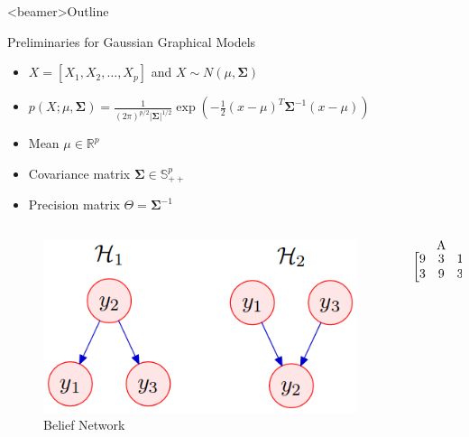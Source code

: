 \documentclass{beamer}
\begin{document}
\begin{frame}<beamer>{Outline}
\end{frame}

\begin{frame}{Preliminaries for Gaussian Graphical Models}
  \begin{itemize}
  \item $X=[X_1,X_2,\dots,X_p]$ and $X \sim N(\mu, \mathbf{\Sigma})$
  \item $p ( X ; \mu , \mathbf{\Sigma} ) = \frac { 1 } { ( 2 \pi ) ^ { p / 2 }
      | \mathbf{\Sigma} | ^ { 1 / 2 } } \exp \left( - \frac { 1 } { 2 } ( x -
      \mu ) ^ { T } \mathbf{\Sigma} ^ { - 1 } ( x - \mu ) \right)$
  \item Mean $\mu \in \mathbf { \mathbb{R} } ^ { p }$
  \item Covariance matrix $\mathbf{\Sigma} \in \mathbf { \mathbb{S} } _ { + + } ^ { p }$
  \item Precision matrix $\Theta = \mathbf{\Sigma}^{-1}$
  \end{itemize}
  \begin{columns}
    \begin{column}{0.38\textwidth}
      \begin{figure}[ht]
        \centering
        \includegraphics[width=1\textwidth,keepaspectratio]{img/belief}
        \caption*{Belief Network\label{fig:belief}\footnotemark}
      \end{figure}
    \end{column}
    \begin{column}{0.48\textwidth}
      \[
        \stackrel{\mbox{A}}{%
          \begin{bmatrix}
            9 & 3 & 1 \\
            3 & 9 & 3 \\

\end{bmatrix}}\]
\end{column}
\end{columns}
\end{frame}
\end{document}
